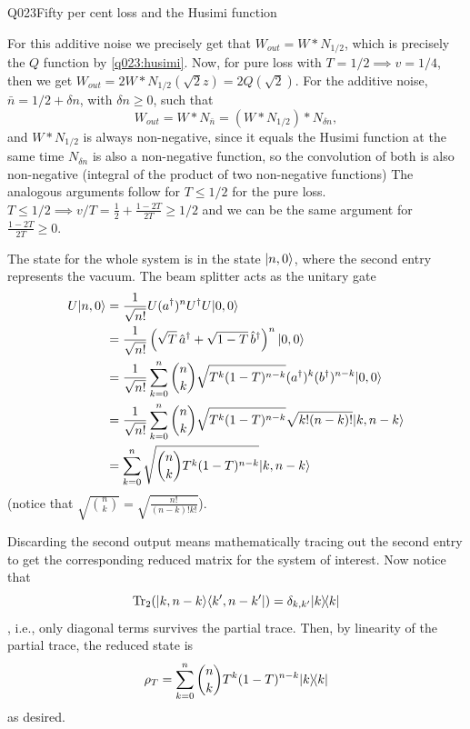 \begin{entry}{Q023}{Fifty per cent loss and the Husimi function}
\begin{solution}[Part (a)]
\end{solution}

\begin{solution}[Part (b)]
For this additive noise we precisely get that  $W_{out}=W * N_{1/2}$, which is precisely the $Q$ function by \eqref{q023:husimi}. Now, for pure loss with $T=1/2 \implies v= 1/4$, then we get $W_{out}= 2 W * N_{1/2}(\sqrt{2}z)=2Q(\sqrt{2})$. For the additive noise, $\bar n = 1/2 + \delta n$, with $\delta n\geq0$, such that 
\begin{equation}
    W_{out}=W * N_{\bar n} = (W * N_{1/2}) * N_{\delta n},
\end{equation}
and $W * N_{1/2}$ is always non-negative, since it equals the Husimi function at the same time $N_{\delta n}$ is also a non-negative function, so the convolution of both is also non-negative (integral of the product of two non-negative functions)
The analogous arguments follow for $T\leq 1/2$ for the pure loss. $T\leq 1/2 \implies v/T = \frac{1}{2} + \frac{1-2T}{2T} \geq 1/2$ and we can be the same argument for $\frac{1-2T}{2T}\geq0$.
\end{solution}

\begin{solution}[Part (c)]
The state for the whole system is in the state $\lvert n,0 \rangle$, where the second entry represents the vacuum. The beam splitter acts as the unitary gate
\begin{equation}
\begin{split}
     U \lvert n,0 \rangle &= \frac{1}{\sqrt{n!}}U (a^\dagger)^n U^\dagger U\lvert 0,0 \rangle \\&= \frac{1}{\sqrt{n!}}\left(\sqrt T\,\hat a^{\dagger}+\sqrt{1-T}\,\hat b^{\dagger}\right)^n \lvert 0,0 \rangle \\
     &=\frac{1}{\sqrt{n!}} \sum_{k=0}^{n} \binom{n}{k} \sqrt{T^{k} (1-T)^{n-k}} (a^\dagger)^{k}(b^\dagger)^{n-k} \lvert 0,0 \rangle\\
     &=\frac{1}{\sqrt{n!}} \sum_{k=0}^{n} \binom{n}{k} \sqrt{T^{k} (1-T)^{n-k}} \sqrt{k!(n-k)!} \lvert k,n-k \rangle\\
     &= \sum_{k=0}^{n}  \sqrt{\binom{n}{k}T^{k} (1-T)^{n-k}} \lvert k,n-k \rangle
\end{split}
\end{equation}
(notice that $ \sqrt{\binom{n}{k}}=\sqrt{\frac{n!}{(n-k)!k!}} $).

Discarding the second output means mathematically tracing out the second entry to get the corresponding reduced matrix for the system of interest. Now notice that $$\operatorname{Tr}_2 ( \lvert k,n-k \rangle \langle k',n-k' \rvert) = \delta_{k,k'} \lvert k \rangle\!\langle k \rvert$$, i.e., only diagonal terms survives the partial trace. Then, by linearity of the partial trace, the reduced state is
\begin{equation}
     \rho_T = \sum_{k=0}^{n}  \binom{n}{k}T^{k} (1-T)^{n-k} \lvert k \rangle\!\langle k \rvert
\end{equation}
as desired.
 


\end{solution}
\end{entry}
